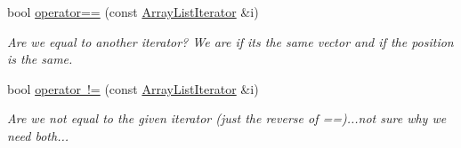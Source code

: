 \begin{DoxyCompactItemize}
bool \mbox{\hyperlink{classssuds_1_1_array_list_1_1_array_list_iterator_abe82e1a8e5e26286392ecf44eee74cf9}{operator==}} (const \mbox{\hyperlink{classssuds_1_1_array_list_1_1_array_list_iterator}{Array\+List\+Iterator}} \&i)
\begin{DoxyCompactList}\small\item\em Are we equal to another iterator? We are if it\textquotesingle{}s the same vector and if the position is the same. \end{DoxyCompactList}\item 
\mbox{\label{classssuds_1_1_array_list_1_1_array_list_iterator_af9ad23ff2870463c9fe529a796d8289f}} 
bool \mbox{\hyperlink{classssuds_1_1_array_list_1_1_array_list_iterator_af9ad23ff2870463c9fe529a796d8289f}{operator !=}} (const \mbox{\hyperlink{classssuds_1_1_array_list_1_1_array_list_iterator}{Array\+List\+Iterator}} \&i)
\begin{DoxyCompactList}\small\item\em Are we not equal to the given iterator (just the reverse of ==)...not sure why we need both... \end{DoxyCompactList}\end{DoxyCompactItemize}
